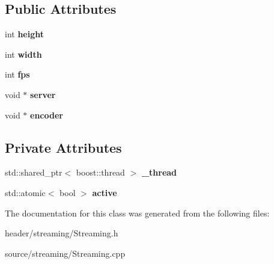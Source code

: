 \subsection*{Public Attributes}
\begin{DoxyCompactItemize}
\item 
\mbox{\label{class_task_container_a437590ece55632ce5af1cbba89e84bd4}} 
int {\bfseries height}
\item 
\mbox{\label{class_task_container_a5e673a4d1c2c40207ec7b6eb7d2e591c}} 
int {\bfseries width}
\item 
\mbox{\label{class_task_container_a82c92b3b0c31a1b36b8b56eac315aff2}} 
int {\bfseries fps}
\item 
\mbox{\label{class_task_container_a935430664e51fd24ee735b32498cdc35}} 
void $\ast$ {\bfseries server}
\item 
\mbox{\label{class_task_container_a4abc1011c030527e670208c1ce65b12d}} 
void $\ast$ {\bfseries encoder}
\end{DoxyCompactItemize}
\subsection*{Private Attributes}
\begin{DoxyCompactItemize}
\item 
\mbox{\label{class_task_container_ac6aacd0a9e93bd538614035a3c60fda4}} 
std\+::shared\+\_\+ptr$<$ boost\+::thread $>$ {\bfseries \+\_\+thread}
\item 
\mbox{\label{class_task_container_ac66a3e356028457291145b47950f0dab}} 
std\+::atomic$<$ bool $>$ {\bfseries active}
\end{DoxyCompactItemize}


The documentation for this class was generated from the following files\+:\begin{DoxyCompactItemize}
\item 
header/streaming/Streaming.\+h\item 
source/streaming/Streaming.\+cpp\end{DoxyCompactItemize}
